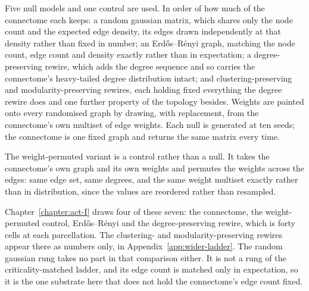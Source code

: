 Five null models and one control are used. In order of how much of the
connectome each keeps: 
a random gaussian matrix, which shares only the node count and the expected edge
density, its edges drawn independently at that density rather than fixed in
number; an Erdős–Rényi graph, matching the node
count, edge count and density exactly rather than in expectation; a
degree-preserving rewire, which adds the degree sequence and so carries the
connectome's heavy-tailed degree distribution intact; and
clustering-preserving and modularity-preserving rewires, each holding fixed
everything the degree rewire does and one further property of the topology
besides. Weights are painted onto every randomised graph by drawing, with
replacement, from the connectome's own multiset of edge
weights. %
Each null is generated at ten seeds; %
the connectome is one fixed graph and returns the same matrix every time.

The weight-permuted variant is a control rather than a null. It takes the
connectome's own graph and its own weights and permutes the weights across the
edges: same edge set, same degrees, and the same weight multiset exactly rather
than in distribution, since the values are reordered rather than
resampled. %

Chapter~\ref{chapter:act-I} draws four of these seven: the connectome, the
weight-permuted control, Erdős–Rényi and the degree-preserving rewire, which is
forty cells at each parcellation. The clustering- and modularity-preserving
rewires appear there as numbers only, in Appendix~\ref{app:wider-ladder}. 
The random gaussian rung takes no part in that comparison either. It is not a
rung of the criticality-matched ladder, and its edge count is matched only in
expectation, so it is the one substrate here that does not hold the connectome's
edge count fixed.

